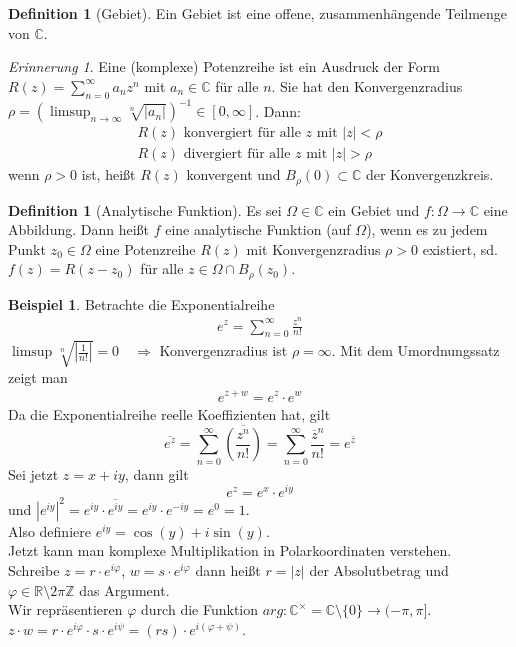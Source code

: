 \documentclass[11pt,titlepage]{article}
\theoremstyle{definition}
\newtheorem{definition}[theorem]{Definition}
\newtheorem{example}[theorem]{Beispiel}
\theoremstyle{remark}
\newtheorem*{remind}{Erinnerung}
\begin{document}
	\begin{definition}[Gebiet]
		Ein Gebiet ist eine offene, zusammenhängende Teilmenge von $\mathbb{C}$.
	\end{definition}
	
	\begin{remind}
		Eine (komplexe) Potenzreihe ist ein Ausdruck der Form $R(z)=\sum^{\infty}_{n=0} a_n z^n$ mit 
		$a_n \in \mathbb{C}$ für alle $n$. Sie hat den Konvergenzradius $\rho = \left( \limsup_{n\to\infty}
		\sqrt[n]{|a_n |}\right)^{-1} \in [0,\infty]$. Dann:
		\begin{eqnarray*}
			R(z)\text{ konvergiert für alle $z$ mit }|z|< \rho \\
			R(z)\text{ divergiert für alle $z$ mit }|z|> \rho 
		\end{eqnarray*}
		wenn $\rho>0$ ist, heißt $R(z)$ konvergent und $B_{\rho}(0)\subset \mathbb{C}$ der 
		Konvergenzkreis.
	\end{remind}
	
	\begin{definition}[Analytische Funktion]
		Es sei $\Omega\in\mathbb{C}$ ein Gebiet und $f:\Omega\to\mathbb{C}$ eine Abbildung. 
		Dann heißt $f$ eine analytische Funktion (auf $\Omega$), wenn es zu jedem Punkt 
		$z_0 \in \Omega$ eine Potenzreihe $R(z)$ mit Konvergenzradius $\rho>0$ existiert, sd. 
		$f(z)=R(z-z_0 )$ für alle $z\in \Omega\cap B_{\rho}(z_0)$.
	\end{definition}
	
	\begin{example}
		Betrachte die Exponentialreihe
		\begin{eqnarray*}
			e^z = \sum_{n=0}^{\infty} \frac{z^n}{n!} 
		\end{eqnarray*}
		$\limsup \sqrt[n]{|\frac{1}{n!}|} =0 \quad \Rightarrow$ Konvergenzradius ist $\rho=\infty$.
		Mit dem Umordnungssatz zeigt man 
		\begin{eqnarray*}
			e^{z+w} =e^z \cdot e^w
		\end{eqnarray*}
		Da die Exponentialreihe reelle Koeffizienten hat, gilt
		\[ \overline{e^z} =\sum_{n=0}^{\infty} \overline{\left( \frac{z^n}{n!} \right)} = 
		\sum_{n=0}^{\infty} \frac{ \overline{z}^n}{n!} = e^{\overline{z}} \]
		Sei jetzt $z=x+iy$, dann gilt 
		\[e^z = e^x \cdot e^{iy} \]
		und $|e^{iy}|^2 = e^{iy} \cdot \overline{e^{iy}} = e^{iy} \cdot e^{-iy} = e^0 = 1$. \\
		Also definiere $e^{iy}=\cos(y)+i\sin (y)$.\\
		Jetzt kann man komplexe Multiplikation in Polarkoordinaten verstehen. \\
		Schreibe $z=r\cdot e^{i\varphi}$, $w=s\cdot e^{i\varphi}$ dann heißt $r=|z|$ der Absolutbetrag
		 und 
		$\varphi\in \mathbb{R}\setminus 2\pi \mathbb{Z}$ das Argument. \\
		Wir repräsentieren $\varphi$ durch die Funktion $arg:\mathbb{C}^{\times} =\mathbb{C}\setminus 
		\{ 0\} \to (-\pi ,\pi]$. \\
		$z\cdot w= r\cdot e^{i\varphi} \cdot s \cdot e^{i\psi} = (rs)\cdot e^{i(\varphi+\psi)}$.
	\end{example}
	
\end{document}
